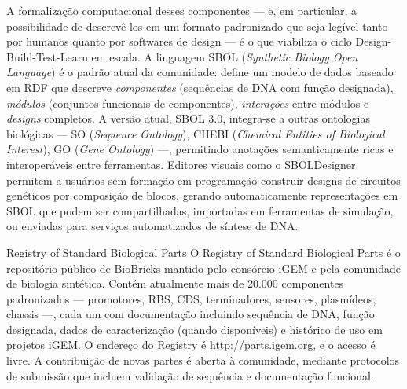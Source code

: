 A formalização computacional desses componentes --- e, em particular, a possibilidade de descrevê-los em um formato padronizado que seja legível tanto por humanos quanto por softwares de design --- é o que viabiliza o ciclo Design-Build-Test-Learn em escala. A linguagem SBOL (\emph{Synthetic Biology Open Language}) é o padrão atual da comunidade: define um modelo de dados baseado em RDF que descreve \emph{componentes} (sequências de DNA com função designada), \emph{módulos} (conjuntos funcionais de componentes), \emph{interações} entre módulos e \emph{designs} completos. A versão atual, SBOL 3.0, integra-se a outras ontologias biológicas --- SO (\emph{Sequence Ontology}), CHEBI (\emph{Chemical Entities of Biological Interest}), GO (\emph{Gene Ontology}) ---, permitindo anotações semanticamente ricas e interoperáveis entre ferramentas. Editores visuais como o SBOLDesigner permitem a usuários sem formação em programação construir designs de circuitos genéticos por composição de blocos, gerando automaticamente representações em SBOL que podem ser compartilhadas, importadas em ferramentas de simulação, ou enviadas para serviços automatizados de síntese de DNA.

\begin{definicao}{Registry of Standard Biological Parts}
O Registry of Standard Biological Parts é o repositório público de BioBricks mantido pelo consórcio iGEM e pela comunidade de biologia sintética. Contém atualmente mais de 20.000 componentes padronizados --- promotores, RBS, CDS, terminadores, sensores, plasmídeos, chassis ---, cada um com documentação incluindo sequência de DNA, função designada, dados de caracterização (quando disponíveis) e histórico de uso em projetos iGEM. O endereço do Registry é \url{http://parts.igem.org}, e o acesso é livre. A contribuição de novas partes é aberta à comunidade, mediante protocolos de submissão que incluem validação de sequência e documentação funcional.
\end{definicao}

